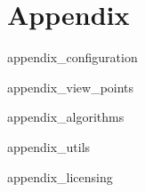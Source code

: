 \chapter{Appendix}
\label{sec:appendix}

 {appendix_configuration}

 {appendix_view_points}

 {appendix_algorithms}

 {appendix_utils}

 {appendix_licensing} 
